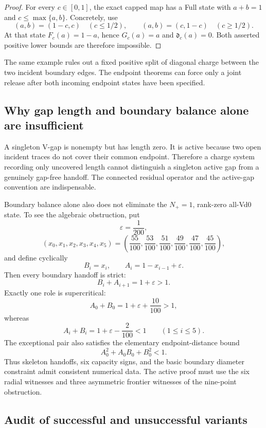 \begin{proof}
For every \(c\in[0,1]\), the exact capped map has a Full state with
\(a+b=1\) and \(c\le\max\{a,b\}\).  Concretely, use
\[
 (a,b)=(1-c,c)\quad(c\le1/2),
 \qquad
 (a,b)=(c,1-c)\quad(c\ge1/2).
\]
At that state \(F_c(a)=1-a\), hence \(G_c(a)=a\) and
\(\mathfrak d_c(a)=0\).  Both asserted positive lower bounds are therefore
impossible.
\end{proof}

The same example rules out a fixed positive split of diagonal charge between
the two incident boundary edges.  The endpoint theorems can force only a
joint release after both incoming endpoint states have been specified.

\subsection{Why gap length and boundary balance alone are insufficient}

A singleton V-gap is nonempty but has length zero.  It is active because two
open incident traces do not cover their common endpoint.  Therefore a charge
system recording only uncovered length cannot distinguish a singleton active
gap from a genuinely gap-free handoff.  The connected residual operator and
the active-gap convention are indispensable.

Boundary balance alone also does not eliminate the \(N_+=1\), rank-zero
all-Vd0 state.  To see the algebraic obstruction, put
\[
 \varepsilon=\frac1{200},
\]
\[
 (x_0,x_1,x_2,x_3,x_4,x_5)
 =\left(\frac{55}{100},\frac{53}{100},\frac{51}{100},
        \frac{49}{100},\frac{47}{100},\frac{45}{100}\right),
\]
and define cyclically
\[
 B_i=x_i,
 \qquad
 A_i=1-x_{i-1}+\varepsilon.
\]
Then every boundary handoff is strict:
\[
 B_i+A_{i+1}=1+\varepsilon>1.
\]
Exactly one role is supercritical:
\[
 A_0+B_0=1+\varepsilon+\frac{10}{100}>1,
\]
whereas
\[
 A_i+B_i=1+\varepsilon-\frac2{100}<1
 \qquad(1\le i\le5).
\]
The exceptional pair also satisfies the elementary endpoint-distance bound
\[
 A_0^2+A_0B_0+B_0^2<1.
\]
Thus skeleton handoffs, six capacity signs, and the basic boundary diameter
constraint admit consistent numerical data.  The active proof must use the
six radial witnesses and three asymmetric frontier witnesses of the
nine-point obstruction.

\subsection{Audit of successful and unsuccessful variants}

